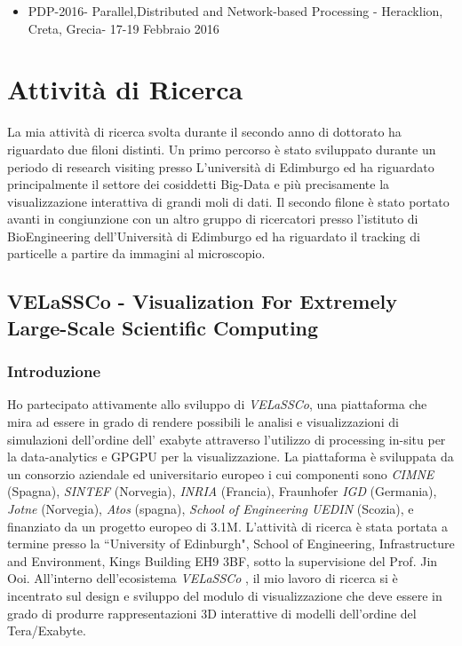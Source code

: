 \begin{itemize}
  \item PDP-2016- Parallel,Distributed and Network-based Processing - Heracklion, Creta,
  Grecia- 17-19 Febbraio  2016
\end{itemize}



\section{Attività di Ricerca}
La mia attività di ricerca svolta durante il secondo anno di dottorato ha riguardato due filoni distinti. Un primo percorso è stato sviluppato durante un periodo di research visiting presso L'università di Edimburgo ed ha riguardato principalmente il settore dei cosiddetti Big-Data e più precisamente la visualizzazione interattiva di grandi moli di dati.
Il secondo filone è stato portato avanti in congiunzione con un altro gruppo di ricercatori presso l'istituto di BioEngineering dell'Università di Edimburgo ed ha riguardato il tracking di particelle a partire da immagini al microscopio.


\subsection{VELaSSCo - Visualization For Extremely Large-Scale Scientific Computing}
\subsubsection{Introduzione}
Ho partecipato attivamente allo sviluppo di \textit{VELaSSCo}, una piattaforma che mira ad essere in grado di rendere possibili le analisi e visualizzazioni di simulazioni dell'ordine dell' exabyte attraverso l'utilizzo di processing in-situ per la data-analytics e GPGPU per la visualizzazione. La piattaforma è sviluppata da un consorzio aziendale ed universitario europeo i cui componenti sono \textit{CIMNE} (Spagna), \textit{SINTEF} (Norvegia), \textit{INRIA} (Francia), Fraunhofer \textit{IGD} (Germania), \textit{Jotne} (Norvegia), \textit{Atos} (spagna), \textit{School of Engineering UEDIN} (Scozia), e finanziato da un progetto europeo di 3.1M. 
L'attività di ricerca è stata portata a termine presso la ``University of Edinburgh", School of Engineering, Infrastructure and Environment, Kings Building EH9 3BF, sotto la supervisione del Prof. Jin Ooi. 
All'interno dell'ecosistema \textit{VELaSSCo} , il mio lavoro di ricerca si è incentrato sul design e sviluppo del modulo di visualizzazione che deve essere in grado di produrre rappresentazioni 3D interattive di modelli dell'ordine del Tera/Exabyte.

